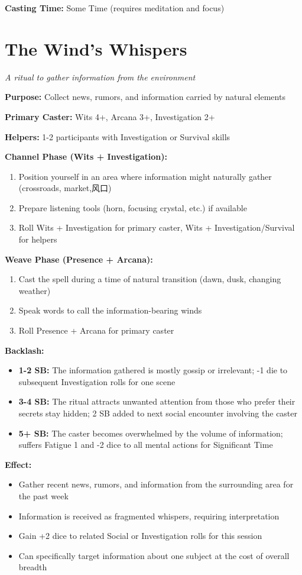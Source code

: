 \textbf{Casting Time:} Some Time (requires meditation and focus)

\section*{The Wind's Whispers}
\textit{A ritual to gather information from the environment}

\textbf{Purpose:} Collect news, rumors, and information carried by natural elements

\textbf{Primary Caster:} Wits 4+, Arcana 3+, Investigation 2+

\textbf{Helpers:} 1-2 participants with Investigation or Survival skills

\textbf{Channel Phase (Wits + Investigation):}
\begin{enumerate}
\item Position yourself in an area where information might naturally gather (crossroads, market,风口)
\item Prepare listening tools (horn, focusing crystal, etc.) if available
\item Roll Wits + Investigation for primary caster, Wits + Investigation/Survival for helpers
\end{enumerate}

\textbf{Weave Phase (Presence + Arcana):}
\begin{enumerate}
\item Cast the spell during a time of natural transition (dawn, dusk, changing weather)
\item Speak words to call the information-bearing winds
\item Roll Presence + Arcana for primary caster
\end{enumerate}

\textbf{Backlash:}
\begin{itemize}
\item \textbf{1-2 SB:} The information gathered is mostly gossip or irrelevant; -1 die to subsequent Investigation rolls for one scene
\item \textbf{3-4 SB:} The ritual attracts unwanted attention from those who prefer their secrets stay hidden; 2 SB added to next social encounter involving the caster
\item \textbf{5+ SB:} The caster becomes overwhelmed by the volume of information; suffers Fatigue 1 and -2 dice to all mental actions for Significant Time
\end{itemize}

\textbf{Effect:}
\begin{itemize}
\item Gather recent news, rumors, and information from the surrounding area for the past week
\item Information is received as fragmented whispers, requiring interpretation
\item Gain +2 dice to related Social or Investigation rolls for this session
\item Can specifically target information about one subject at the cost of overall breadth
\end{itemize}

